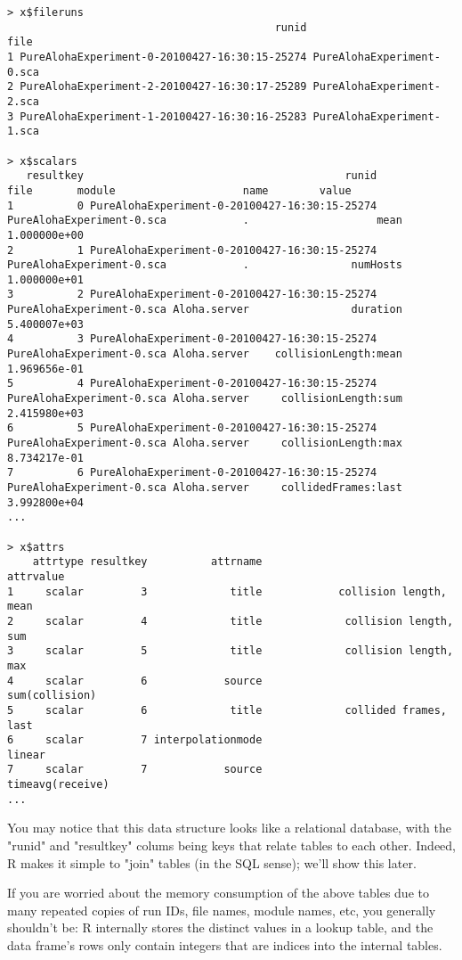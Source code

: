 \begin{verbatim}
> x$fileruns
                                          runid                      file
1 PureAlohaExperiment-0-20100427-16:30:15-25274 PureAlohaExperiment-0.sca
2 PureAlohaExperiment-2-20100427-16:30:17-25289 PureAlohaExperiment-2.sca
3 PureAlohaExperiment-1-20100427-16:30:16-25283 PureAlohaExperiment-1.sca

> x$scalars
   resultkey                                         runid                      file       module                    name        value
1          0 PureAlohaExperiment-0-20100427-16:30:15-25274 PureAlohaExperiment-0.sca            .                    mean 1.000000e+00
2          1 PureAlohaExperiment-0-20100427-16:30:15-25274 PureAlohaExperiment-0.sca            .                numHosts 1.000000e+01
3          2 PureAlohaExperiment-0-20100427-16:30:15-25274 PureAlohaExperiment-0.sca Aloha.server                duration 5.400007e+03
4          3 PureAlohaExperiment-0-20100427-16:30:15-25274 PureAlohaExperiment-0.sca Aloha.server    collisionLength:mean 1.969656e-01
5          4 PureAlohaExperiment-0-20100427-16:30:15-25274 PureAlohaExperiment-0.sca Aloha.server     collisionLength:sum 2.415980e+03
6          5 PureAlohaExperiment-0-20100427-16:30:15-25274 PureAlohaExperiment-0.sca Aloha.server     collisionLength:max 8.734217e-01
7          6 PureAlohaExperiment-0-20100427-16:30:15-25274 PureAlohaExperiment-0.sca Aloha.server     collidedFrames:last 3.992800e+04
...

> x$attrs
    attrtype resultkey          attrname                         attrvalue
1     scalar         3             title            collision length, mean
2     scalar         4             title             collision length, sum
3     scalar         5             title             collision length, max
4     scalar         6            source                    sum(collision)
5     scalar         6             title             collided frames, last
6     scalar         7 interpolationmode                            linear
7     scalar         7            source                  timeavg(receive)
...
\end{verbatim}

You may notice that this data structure looks like a relational database, with
the "runid" and "resultkey" colums being keys that relate tables to each other.
Indeed, R makes it simple to "join" tables (in the SQL sense); we'll show this later.

If you are worried about the memory consumption of the above tables due to many
repeated copies of run IDs, file names, module names, etc, you generally shouldn't be:
R internally stores the distinct values in a lookup table, and the data frame's rows
only contain integers that are indices into the internal tables.

